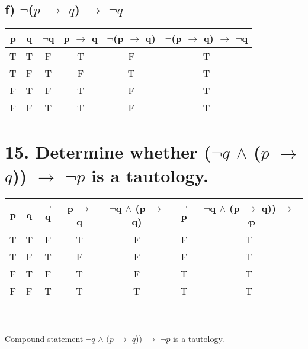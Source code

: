 \documentclass[11pt, oneside]{article} %
\numberwithin{equation}{section} %
\numberwithin{figure}{section} %
\numberwithin{table}{section} %
\begin{document}
\begin{table}[!htp]
\subsection{f) $\neg$($p$ $\rightarrow$ $q$) $\rightarrow$ $\neg$$q$}
\begin{tabular}{c c c c c c}
\hline\hline
p & q & $\neg$q & p $\rightarrow$ q & $\neg$(p $\rightarrow$ q) & $\neg$(p $\rightarrow$ q) $\rightarrow$ $\neg$q\\ [0.5ex] %
\hline
T & T & F & T & F & T\\
T & F & T & F & T & T\\
F & T & F & T & F & T\\
F & F & T & T & F & T\\ [1ex]
\hline
\end{tabular}
\label{table:nonlin}
\end{table}

\begin{table}[!htp]
\section{15. Determine whether ($\neg$$q$ $\wedge$ ($p$ $\rightarrow$ $q$)) $\rightarrow$ $\neg$$p$ is a tautology.}
\begin{tabular}{c c c c c c c}
\hline\hline
p & q & $\neg$q & p $\rightarrow$ q & $\neg$q $\wedge$ (p $\rightarrow$ q) & $\neg$p & $\neg$q $\wedge$ (p $\rightarrow$ q)) $\rightarrow$ $\neg$p\\ [0.5ex] %
\hline
T & T & F & T & F & F & T\\
T & F & T & F & F & F & T\\
F & T & F & T & F & T & T\\
F & F & T & T & T & T & T\\ [1ex]
\hline
\end{tabular}
\\\\
Compound statement $\neg$$q$ $\wedge$ $(p$ $\rightarrow$ $q$)) $\rightarrow$ $\neg$$p$ is a tautology. \\
\label{table:nonlin}
\end{table}

\end{document}
